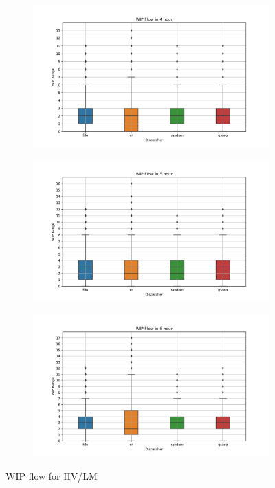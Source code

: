 \begin{figure}[t]
	\begin{subfigure}[b]{0.32\textwidth}
		\includegraphics[width=\textwidth]{HVLM/period_14400s.png}
	\end{subfigure}
	\hfill
	\begin{subfigure}[b]{0.32\textwidth}
		\includegraphics[width=\textwidth]{HVLM/period_18000s.png}
	\end{subfigure}
	\hfill
	\begin{subfigure}[b]{0.32\textwidth}
		\includegraphics[width=\textwidth]{HVLM/period_21600s.png}
	\end{subfigure}
	\caption{WIP flow for HV/LM}
	\label{fig:wip-flows-HVLM}
\end{figure}

